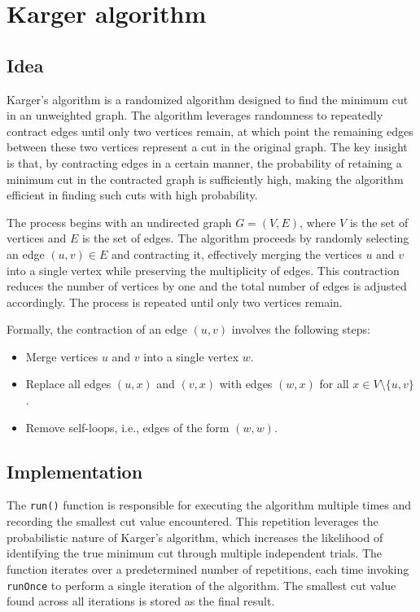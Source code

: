 \section{Karger algorithm}
\label{sec:karger}

    \subsection{Idea}
    
    Karger's algorithm is a randomized algorithm designed to find the minimum cut in an unweighted graph. The algorithm leverages randomness to repeatedly contract edges until only two vertices remain, at which point the remaining edges between these two vertices represent a cut in the original graph. The key insight is that, by contracting edges in a certain manner, the probability of retaining a minimum cut in the contracted graph is sufficiently high, making the algorithm efficient in finding such cuts with high probability.

    The process begins with an undirected graph \(G = (V, E)\), where \(V\) is the set of vertices and \(E\) is the set of edges. The algorithm proceeds by randomly selecting an edge \((u, v) \in E\) and contracting it, effectively merging the vertices \(u\) and \(v\) into a single vertex while preserving the multiplicity of edges. This contraction reduces the number of vertices by one and the total number of edges is adjusted accordingly. The process is repeated until only two vertices remain.

    Formally, the contraction of an edge \((u, v)\) involves the following steps:
    \begin{itemize}
        \item Merge vertices \(u\) and \(v\) into a single vertex \(w\).
        \item Replace all edges \((u, x)\) and \((v, x)\) with edges \((w, x)\) for all \(x \in V \setminus \{u, v\}\).
        \item Remove self-loops, i.e., edges of the form \((w, w)\).
    \end{itemize}


    \subsection{Implementation}
    
    The \texttt{run()} function is responsible for executing the algorithm multiple times and recording the smallest cut value encountered. This repetition leverages the probabilistic nature of Karger's algorithm, which increases the likelihood of identifying the true minimum cut through multiple independent trials. The function iterates over a predetermined number of repetitions, each time invoking \texttt{runOnce} to perform a single iteration of the algorithm. The smallest cut value found across all iterations is stored as the final result.

